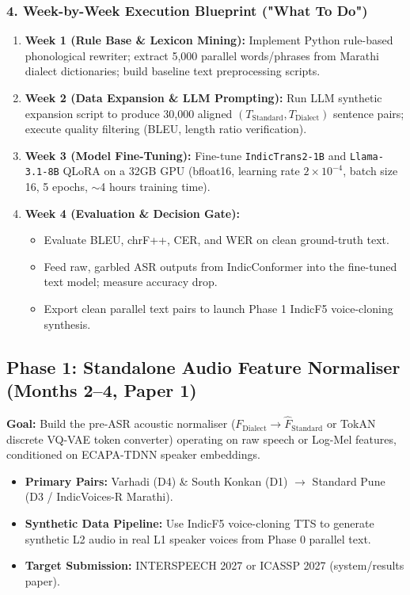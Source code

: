 \documentclass[11pt]{article}
\begin{document}
\subsubsection{4. Week-by-Week Execution Blueprint ("What To Do")}
\begin{enumerate}[leftmargin=*]
  \item \textbf{Week 1 (Rule Base \& Lexicon Mining):} Implement Python rule-based phonological rewriter; extract 5,000 parallel words/phrases from Marathi dialect dictionaries; build baseline text preprocessing scripts.
  \item \textbf{Week 2 (Data Expansion \& LLM Prompting):} Run LLM synthetic expansion script to produce 30,000 aligned $(T_{\text{Standard}}, T_{\text{Dialect}})$ sentence pairs; execute quality filtering (BLEU, length ratio verification).
  \item \textbf{Week 3 (Model Fine-Tuning):} Fine-tune \texttt{IndicTrans2-1B} and \texttt{Llama-3.1-8B} QLoRA on a 32GB GPU (bfloat16, learning rate $2 \times 10^{-4}$, batch size 16, 5 epochs, $\sim$4 hours training time).
  \item \textbf{Week 4 (Evaluation \& Decision Gate):}
    \begin{itemize}[leftmargin=*]
      \item Evaluate BLEU, chrF++, CER, and WER on clean ground-truth text.
      \item Feed raw, garbled ASR outputs from IndicConformer into the fine-tuned text model; measure accuracy drop.
      \item Export clean parallel text pairs to launch Phase 1 IndicF5 voice-cloning synthesis.
    \end{itemize}
\end{enumerate}

\subsection{Phase 1: Standalone Audio Feature Normaliser (Months 2--4, Paper 1)}
\textbf{Goal:} Build the pre-ASR acoustic normaliser ($F_{\text{Dialect}} \to \hat{F}_{\text{Standard}}$ or TokAN discrete VQ-VAE token converter) operating on raw speech or Log-Mel features, conditioned on ECAPA-TDNN speaker embeddings.
\begin{itemize}[leftmargin=*]
  \item \textbf{Primary Pairs:} Varhadi (D4) \& South Konkan (D1) $\rightarrow$ Standard Pune (D3 / IndicVoices-R Marathi).
  \item \textbf{Synthetic Data Pipeline:} Use IndicF5 voice-cloning TTS to generate synthetic L2 audio in real L1 speaker voices from Phase 0 parallel text.
  \item \textbf{Target Submission:} INTERSPEECH 2027 or ICASSP 2027 (system/results paper).
\end{itemize}
\end{document}

